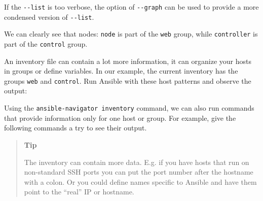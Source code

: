 If the \texttt{-\/-list} is too verbose, the option of
\texttt{-\/-graph} can be used to provide a more condensed version of
\texttt{-\/-list}.

\begin{Shaded}
\begin{Highlighting}[]
\ExtensionTok{[student@controller}\NormalTok{ \textasciitilde{}]$ ansible{-}navigator inventory } 
  \KeywordTok{|}
  \KeywordTok{|}  \KeywordTok{|}
  \KeywordTok{|}
  \KeywordTok{|}
  \KeywordTok{|}  \KeywordTok{|}
\end{Highlighting}
\end{Shaded}

We can clearly see that nodes: \texttt{node} is part of the \texttt{web} group, while
\texttt{controller} is part of the \texttt{control} group.

An inventory file can contain a lot more information, it can organize
your hosts in groups or define variables. In our example, the current
inventory has the groups \texttt{web} and \texttt{control}. Run Ansible
with these host patterns and observe the output:

Using the \texttt{ansible-navigator\ inventory} command, we can also run
commands that provide information only for one host or group. For
example, give the following commands a try to see their output.

\begin{Shaded}
\begin{Highlighting}[]
\ExtensionTok{[student@controller}\NormalTok{ \textasciitilde{}]$ ansible{-}navigator inventory }
\ExtensionTok{[student@controller}\NormalTok{ \textasciitilde{}]$ ansible{-}navigator inventory }
\ExtensionTok{[student@controller}\NormalTok{ \textasciitilde{}]$ ansible{-}navigator inventory }
\end{Highlighting}
\end{Shaded}

\begin{quote}
\textbf{Tip}

The inventory can contain more data. E.g. if you have hosts that run on
non-standard SSH ports you can put the port number after the hostname
with a colon. Or you could define names specific to Ansible and have
them point to the ``real'' IP or hostname.
\end{quote}

